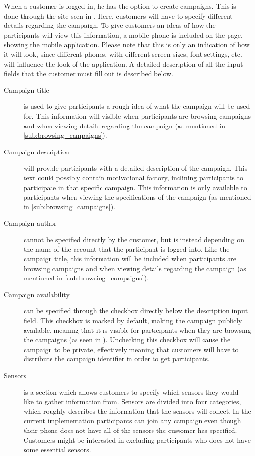 When a customer is logged in, he has the option to create campaigns. This is done through the site seen in . Here, customers will have to specify different details regarding the campaign. To give customers an ideas of how the participants will view this information, a mobile phone is included on the page, showing the mobile application. Please note that this is only an indication of how it will look, since different phones, with different screen sizes, font settings, etc. will influence the look of the application. A detailed description of all the input fields that the customer must fill out is described below.

\begin{description}
    \item[Campaign title] is used to give participants a rough idea of what the campaign will be used for. This information will visible when participants are browsing campaigns and when viewing details regarding the campaign (as mentioned in \ref{sub:browsing_campaigns}).

    \item[Campaign description] will provide participants with a detailed description of the campaign. This text could possibly contain motivational factory, inclining participants to participate in that specific campaign. This information is only available to participants when viewing the specifications of the campaign (as mentioned in \ref{sub:browsing_campaigns}).

    \item[Campaign author] cannot be specified directly by the customer, but is instead depending on the name of the account that the participant is logged into. Like the campaign title, this information will be included when participants are browsing campaigns and when viewing details regarding the campaign (as mentioned in \ref{sub:browsing_campaigns}).

    \item[Campaign availability] can be specified through the checkbox directly below the description input field. This checkbox is marked by default, making the campaign publicly available, meaning that it is visible for participants when they are browsing the campaigns (as seen in ). Unchecking this checkbox will cause the campaign to be private, effectively meaning that customers will have to distribute the campaign identifier in order to get participants.

    \item[Sensors] is a section which allows customers to specify which sensors they would like to gather information from. Sensors are divided into four categories, which roughly describes the information that the sensors will collect. In the current implementation participants can join any campaign even though their phone does not have all of the sensors the customer has specified. Customers might be interested in excluding participants who does not have some essential sensors.


\end{description}
